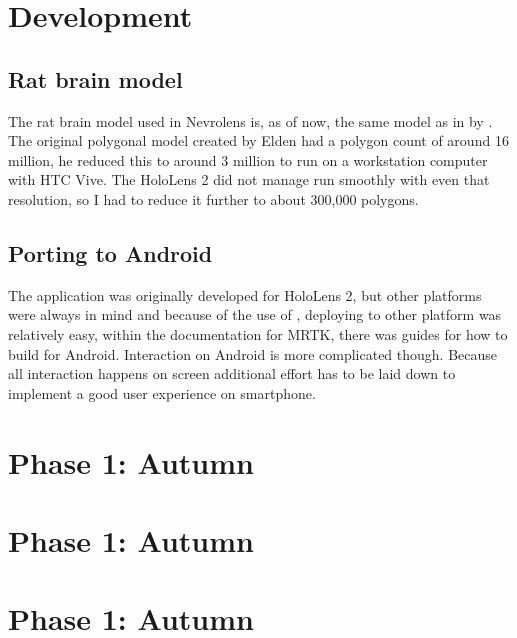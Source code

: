 



\section{Development}

\subsection*{Rat brain model}
The rat brain model used in Nevrolens is, as of now, the same model as in  by \citet{Elden2017}. The original polygonal model created by Elden had a polygon count of around 16 million, he reduced this to around 3 million to run on a workstation computer with HTC Vive. The HoloLens 2 did not manage run smoothly with even that resolution, so I had to reduce it further to about 300,000 polygons.

\subsection*{Porting to Android}
The application was originally developed for HoloLens 2, but other platforms were always in mind and because of the use of , deploying to other platform was relatively easy, within the documentation for MRTK, there was guides for how to build for Android. Interaction on Android is more complicated though. Because all interaction happens on screen additional effort has to be laid down to implement a good user experience on smartphone.  


\section{Phase 1: Autumn}
\section{Phase 1: Autumn}
\section{Phase 1: Autumn}









